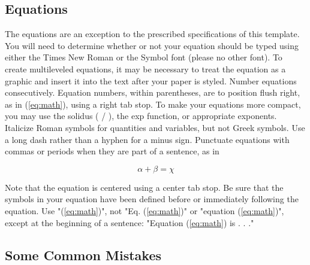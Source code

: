 \documentclass[conference]{IEEEtran}
\begin{document}
\subsection{Equations} 
The equations are an exception to the prescribed specifications of this template. You will need to determine whether or not your equation should be typed using either the Times New Roman or the Symbol font (please no other font). To create multileveled equations, it may be necessary to treat the equation as a graphic and insert it into the text after your paper is styled.
Number equations consecutively. Equation numbers, within parentheses, are to position flush right, as in (\ref{eq:math}), using a right tab stop. To make your equations more compact, you may use the solidus ( / ), the exp function, or appropriate exponents. Italicize Roman symbols for quantities and variables, but not Greek symbols. Use a long dash rather than a hyphen for a minus sign. Punctuate equations with commas or periods when they are part of a sentence, as in

\begin{equation}\label{eq:math}
\alpha + \beta = \chi
\end{equation}

Note that the equation is centered using a center tab stop. Be sure that the symbols in your equation have been defined before or immediately following the equation. Use "(\ref{eq:math})", not "Eq. (\ref{eq:math})" or "equation (\ref{eq:math})", except at the beginning of a sentence: "Equation (\ref{eq:math}) is . . ."

\subsection{Some Common Mistakes} 
\end{document}

